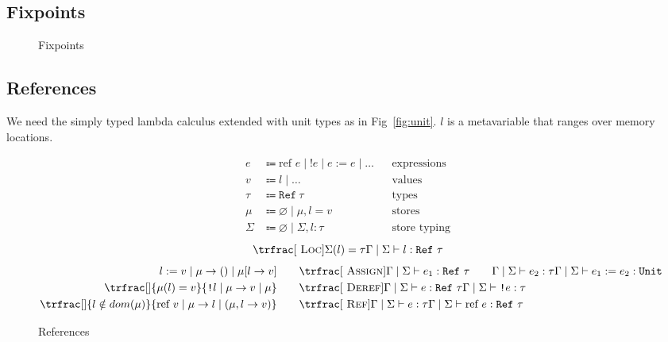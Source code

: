 \documentclass[nonacm]{acmart}
\newcommand{\unit}{\texttt{Unit}}
\newcommand{\reference}[1]{\text{ref } #1}
\begin{document}
\subsection{Fixpoints}

\begin{figure}
  \begin{framed}
  \end{framed}
  \caption{Fixpoints}\label{fig:fixpoints}
\end{figure}

\subsection{References}

We need the simply typed lambda calculus extended with unit types as in Fig~\ref{fig:unit}.
\(l\) is a metavariable that ranges over memory locations.

\begin{figure}
  \begin{framed}
    \begin{align*}
      e      & \Coloneqq \reference{e} \mid \texttt{!}e \mid e := e \mid \dots &  & \text{expressions}  \\
      v      & \Coloneqq l \mid \dots                                          &  & \text{values}       \\
      \tau   & \Coloneqq \texttt{Ref}~\tau                                     &  & \text{types}        \\
      \mu    & \Coloneqq \varnothing \mid \mu, l = v                           &  & \text{stores}       \\
      \Sigma & \Coloneqq \varnothing \mid \Sigma, l : \tau                     &  & \text{store typing}
    \end{align*}
    \[
      \trfrac[~\textsc{Loc}]{\Sigma(l) = \tau}{\Gamma \mid \Sigma \vdash l : \texttt{Ref}~\tau}
    \]
    \begin{align*}
      l := v \mid \mu \rightarrow () \mid \mu[l \rightarrow v]
      \qquad &
      \trfrac[~\textsc{Assign}]{\Gamma \mid \Sigma \vdash e_1 :
        \texttt{Ref}~\tau \qquad \Gamma \mid \Sigma \vdash e_2 : \tau}{
      \Gamma \mid \Sigma \vdash e_1 := e_2 : \unit}                                                                           \\
      \trfrac[]{\mu (l) = v}{\texttt{!} l \mid \mu \rightarrow v \mid \mu}
      \qquad &
      \trfrac[~\textsc{Deref}]{\Gamma \mid \Sigma \vdash e : \texttt{Ref}~\tau}{\Gamma \mid \Sigma \vdash \texttt{!}e : \tau} \\
      \trfrac[]{l \notin dom(\mu)}{\reference{v} \mid \mu \rightarrow l \mid (\mu, l \rightarrow v)}
      \qquad &
      \trfrac[~\textsc{Ref}]{\Gamma \mid \Sigma \vdash e : \tau}{\Gamma \mid \Sigma \vdash \reference{e} : \texttt{Ref}~\tau}
    \end{align*}
  \end{framed}
  \caption{References}\label{fig:references}
\end{figure}
\end{document}
